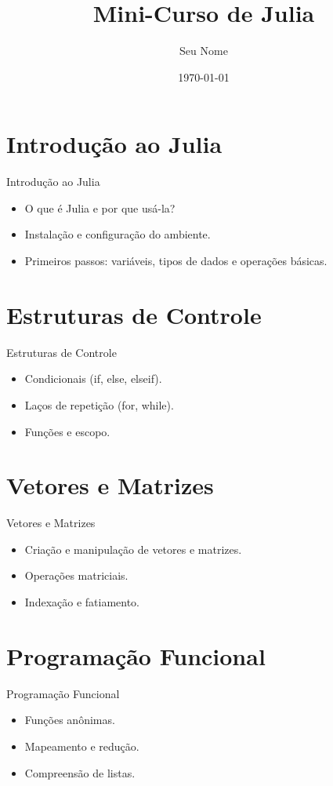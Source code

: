 \documentclass{beamer}
\title{Mini-Curso de Julia}
\author{Seu Nome}
\date{\today}
\begin{document}
\frame{\titlepage}

\section{Introdução ao Julia}
\begin{frame}{Introdução ao Julia}
    \begin{itemize}
        \item O que é Julia e por que usá-la?
        \item Instalação e configuração do ambiente.
        \item Primeiros passos: variáveis, tipos de dados e operações básicas.
    \end{itemize}
\end{frame}

\section{Estruturas de Controle}
\begin{frame}{Estruturas de Controle}
    \begin{itemize}
        \item Condicionais (if, else, elseif).
        \item Laços de repetição (for, while).
        \item Funções e escopo.
    \end{itemize}
\end{frame}

\section{Vetores e Matrizes}
\begin{frame}{Vetores e Matrizes}
    \begin{itemize}
        \item Criação e manipulação de vetores e matrizes.
        \item Operações matriciais.
        \item Indexação e fatiamento.
    \end{itemize}
\end{frame}

\section{Programação Funcional}
\begin{frame}{Programação Funcional}
    \begin{itemize}
        \item Funções anônimas.
        \item Mapeamento e redução.
        \item Compreensão de listas.
    \end{itemize}
\end{frame}
\end{document}
